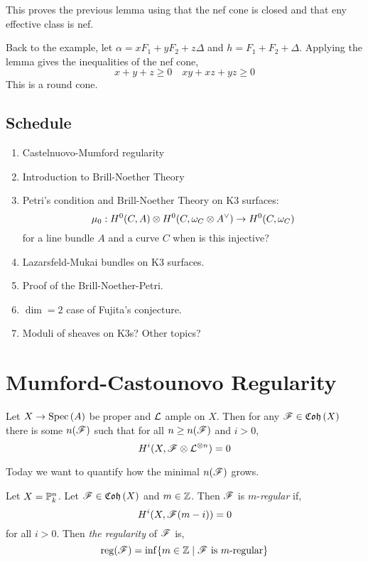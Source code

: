\documentclass[12pt]{article}
\DeclareMathOperator{\reg}{\mathrm{reg}}
\begin{document}
\begin{rmk}
This proves the previous lemma using that the nef cone is closed and that eny effective class is nef. 
\end{rmk}

\begin{rmk}
Back to the example, let $\alpha = x F_1 + y F_2 + z \Delta$ and $h = F_1 + F_2 + \Delta$. Applying the lemma gives the inequalities of the nef cone,
\[  x + y + z \ge 0 \quad xy + xz + y z \ge 0 \]
This is a round cone. 
\end{rmk}

\subsection{Schedule}

\begin{enumerate}
\item Castelnuovo-Mumford regularity
\item Introduction to Brill-Noether Theory
\item Petri's condition and Brill-Noether Theory on K3 surfaces: 
\[ \mu_0 : H^0(C, A) \ot H^0(C, \omega_C \ot A^\vee) \to H^0(C, \omega_C) \]
 for a line bundle $A$ and a curve $C$ when is this injective?
\item Lazarsfeld-Mukai bundles on K3 surfaces.
\item Proof of the Brill-Noether-Petri.
\item $\dim = 2$ case of Fujita's conjecture.
\item Moduli of sheaves on K3s? Other topics?
\end{enumerate}

\section{Mumford-Castounovo Regularity}

\begin{theorem}
Let $X \to \Spec{A}$ be proper and $\L$ ample on $X$. Then for any $\F \in \Coh{X}$ there is some $n(\F)$ such that for all $n \ge n(\F)$ and $i > 0$,
\[ H^i(X, \F \ot \L^{\ot n}) = 0 \]
\end{theorem}

\begin{rmk}
Today we want to quantify how the minimal $n(\F)$ grows.
\end{rmk}

\begin{defn}
Let $X = \P^n_k$. Let $\F \in \Coh{X}$ and $m \in \Z$. Then $\F$ is $m$-\textit{regular} if,
\[ H^i(X, \F(m-i)) = 0 \]
for all $i > 0$. Then \textit{the regularity} of $\F$ is,
\[ \reg(\F) = \inf \{ m \in \Z \mid \F \text{ is } m\text{-regular} \} \]
\end{defn}
\end{document}
